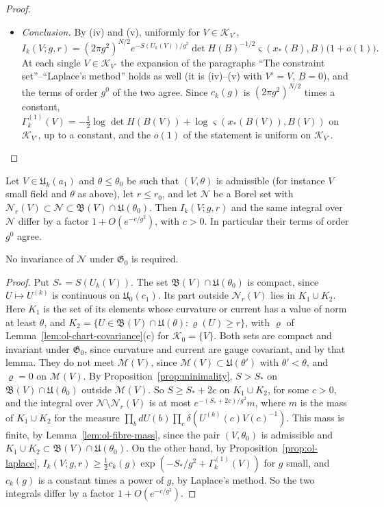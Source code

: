 \begin{proof}
\begin{itemize}
\item[(vi)] \emph{Conclusion.} By (iv) and (v), uniformly for $V\in\mathcal K_{V^\circ}$,
\[
I_k(V;g,r)=(2\pi g^2)^{N/2}e^{-S(U_k(V))/g^2}\det H(B)^{-1/2}\varsigma(x_*(B),B)\big(1+o(1)\big).
\]
At each single $V\in\mathcal K_{V^\circ}$ the expansion of the paragraphs ``The constraint set''--``Laplace's method'' holds as well (it is (iv)--(v) with $V^\circ=V$, $B=0$), and the terms of order $g^0$ of the two agree. Since $c_k(g)$ is $(2\pi g^2)^{N/2}$ times a constant, $\Gamma^{(1)}_k(V)=-\frac12\log\det H(B(V))+\log\varsigma(x_*(B(V)),B(V))$ on $\mathcal K_{V^\circ}$, up to a constant, and the $o(1)$ of the statement is uniform on $\mathcal K_{V^\circ}$.
\end{itemize}
\end{proof}

\begin{lemma}\label{lem:ol-neighbourhood}
Let $V\in\mathfrak U_k(a_1)$ and $\theta\le\theta_0$ be such that $(V,\theta)$ is admissible (for instance $V$ small field and $\theta$ as above), let $r\le r_0$, and let $\mathscr N$ be a Borel set with $\mathscr N_r(V)\subset\mathscr N\subset\mathfrak B(V)\cap\mathfrak U(\theta_0)$. Then $I_k(V;g,r)$ and the same integral over $\mathscr N$ differ by a factor $1+O(e^{-c/g^2})$, with $c>0$. In particular their terms of order $g^0$ agree.
\end{lemma}

No invariance of $\mathscr N$ under $\mathfrak G_0$ is required.

\begin{proof}
Put $S_*=S(U_k(V))$. The set $\mathfrak B(V)\cap\mathfrak U(\theta_0)$ is compact, since $U\mapsto U^{(k)}$ is continuous on $\mathfrak U_0(c_1)$. Its part outside $\mathscr N_r(V)$ lies in $K_1\cup K_2$. Here $K_1$ is the set of its elements whose curvature or current has a value of norm at least $\theta$, and $K_2=\{U\in\mathfrak B(V)\cap\mathfrak U(\theta):\varrho(U)\ge r\}$, with $\varrho$ of Lemma~\ref{lem:ol-chart-covariance}(c) for $\mathcal K_0=\{V\}$. Both sets are compact and invariant under $\mathfrak G_0$, since curvature and current are gauge covariant, and by that lemma. They do not meet $\mathscr M(V)$, since $\mathscr M(V)\subset\mathfrak U(\theta')$ with $\theta'<\theta$, and $\varrho=0$ on $\mathscr M(V)$. By Proposition~\ref{prop:minimality}, $S>S_*$ on $\mathfrak B(V)\cap\mathfrak U(\theta_0)$ outside $\mathscr M(V)$. So $S\ge S_*+2c$ on $K_1\cup K_2$, for some $c>0$, and the integral over $\mathscr N\setminus\mathscr N_r(V)$ is at most $e^{-(S_*+2c)/g^2}m$, where $m$ is the mass of $K_1\cup K_2$ for the measure $\prod_bdU(b)\prod_c\delta(U^{(k)}(c)V(c)^{-1})$. This mass is finite, by Lemma~\ref{lem:ol-fibre-mass}, since the pair $(V,\theta_0)$ is admissible and $K_1\cup K_2\subset\mathfrak B(V)\cap\mathfrak U(\theta_0)$. On the other hand, by Proposition~\ref{prop:ol-laplace}, $I_k(V;g,r)\ge\frac12c_k(g)\exp(-S_*/g^2+\Gamma^{(1)}_k(V))$ for $g$ small, and $c_k(g)$ is a constant times a power of $g$, by Laplace's method. So the two integrals differ by a factor $1+O(e^{-c/g^2})$.
\end{proof}


